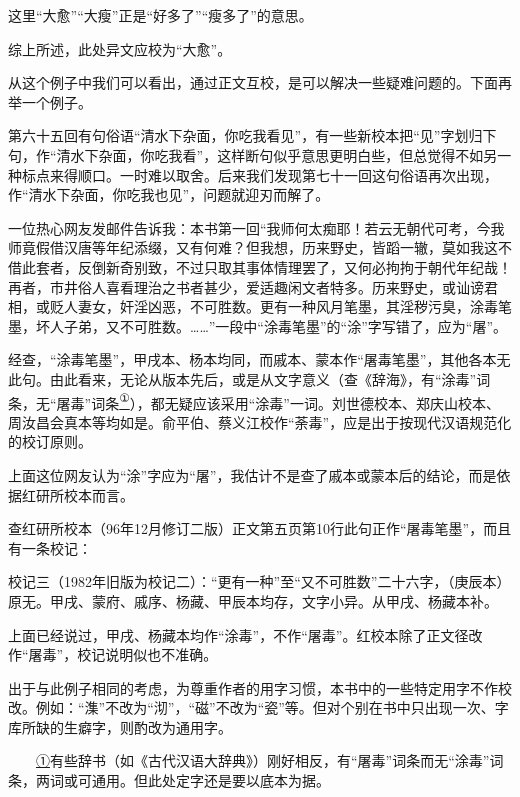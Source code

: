 这里``大愈''``大瘦''正是``好多了''``瘦多了''的意思。

综上所述，此处异文应校为``大愈''。

从这个例子中我们可以看出，通过正文互校，是可以解决一些疑难问题的。下面再举一个例子。

第六十五回有句俗语``清水下杂面，你吃我看见''，有一些新校本把``见''字划归下句，作``清水下杂面，你吃我看''，这样断句似乎意思更明白些，但总觉得不如另一种标点来得顺口。一时难以取舍。后来我们发现第七十一回这句俗语再次出现，作``清水下杂面，你吃我也见''，问题就迎刃而解了。

{{}}

一位热心网友发邮件告诉我：本书第一回``我师何太痴耶！若云无朝代可考，今我师竟假借汉唐等年纪添缀，又有何难？但我想，历来野史，皆蹈一辙，莫如我这不借此套者，反倒新奇别致，不过只取其事体情理罢了，又何必拘拘于朝代年纪哉！再者，市井俗人喜看理治之书者甚少，爱适趣闲文者特多。历来野史，或讪谤君相，或贬人妻女，奸淫凶恶，不可胜数。更有一种风月笔墨，其淫秽污臭，涂毒笔墨，坏人子弟，又不可胜数。\ldots{}\ldots{}''一段中``涂毒笔墨''的``涂''字写错了，应为``屠''。

经查，``涂毒笔墨''，甲戌本、杨本均同，而戚本、蒙本作``屠毒笔墨''，其他各本无此句。由此看来，无论从版本先后，或是从文字意义（查《辞海》，有``涂毒''词条，无``屠毒''词条\href{../Text/part0088.html\#lnkback_1_a}{\textsuperscript{①}}\href{../Text/part0088.html\#lnkback_2_a}{}），都无疑应该采用``涂毒''一词。刘世德校本、郑庆山校本、周汝昌会真本等均如是。俞平伯、蔡义江校作``荼毒''，应是出于按现代汉语规范化的校订原则。

上面这位网友认为``涂''字应为``屠''，我估计不是查了戚本或蒙本后的结论，而是依据红研所校本而言。

查红研所校本（96年12月修订二版）正文第五页第10行此句正作``屠毒笔墨''，而且有一条校记：

校记三（1982年旧版为校记二）：``更有一种''至``又不可胜数''二十六字，（庚辰本）原无。甲戌、蒙府、戚序、杨藏、甲辰本均存，文字小异。从甲戌、杨藏本补。

上面已经说过，甲戌、杨藏本均作``涂毒''，不作``屠毒''。红校本除了正文径改作``屠毒''，校记说明似也不准确。

出于与此例子相同的考虑，为尊重作者的用字习惯，本书中的一些特定用字不作校改。例如：``潗''不改为``沏''，``磁''不改为``瓷''等。但对个别在书中只出现一次、字库所缺的生癖字，则酌改为通用字。

{　　\href{../Text/part0088.html\#navto_1_a}{①}有些辞书（如《古代汉语大辞典》）刚好相反，有``屠毒''词条而无``涂毒''词条，两词或可通用。但此处定字还是要以底本为据。}

